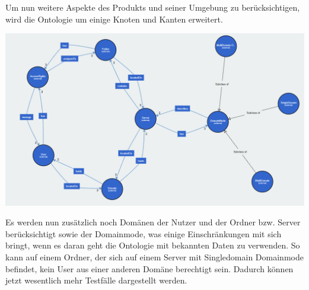 Um nun weitere Aspekte des Produkts und seiner Umgebung zu berücksichtigen, wird die Ontologie um einige Knoten und Kanten erweitert. \\

\begin{center}
    \includegraphics[width=1\textwidth]{Thesis/Images/OntologyBig.png}
\end{center}

Es werden nun zusätzlich noch Domänen der Nutzer und der Ordner bzw. Server berücksichtigt sowie der Domainmode, was einige Einschränkungen mit sich bringt, wenn es daran geht die Ontologie mit bekannten Daten zu verwenden. So kann auf einem Ordner, der sich auf einem Server mit Singledomain Domainmode befindet, kein User aus einer anderen Domäne berechtigt sein. Dadurch können jetzt wesentlich mehr Testfälle dargestellt werden. 
